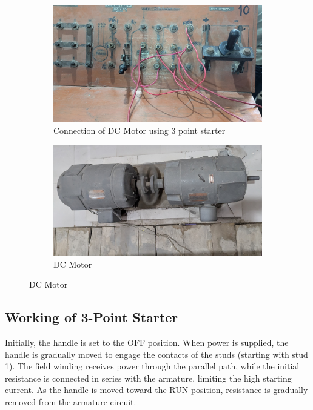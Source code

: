 \documentclass[a4paper,12pt]{article}
\begin{document}
		\begin{figure}[H]
		\centering
		\begin{subfigure}[t]{0.49\textwidth}
			\centering
			\includegraphics[width=1\linewidth]{Images/3pscrkt}
			\caption{Connection of DC Motor using 3 point starter}
		\end{subfigure}
		\hfill
		\begin{subfigure}[t]{0.48\textwidth}
			\centering
			\includegraphics[width=1\linewidth]{Images/mtr}
			\caption{ DC Motor}
		\end{subfigure}
	\end{figure}
	\subsection{Working of 3-Point Starter}
	
	Initially, the handle is set to the OFF position. When power is supplied, the handle is gradually moved to engage the contacts of the studs (starting with stud 1). The field winding receives power through the parallel path, while the initial resistance is connected in series with the armature, limiting the high starting current. As the handle is moved toward the RUN position, resistance is gradually removed from the armature circuit.
	
\end{document}
